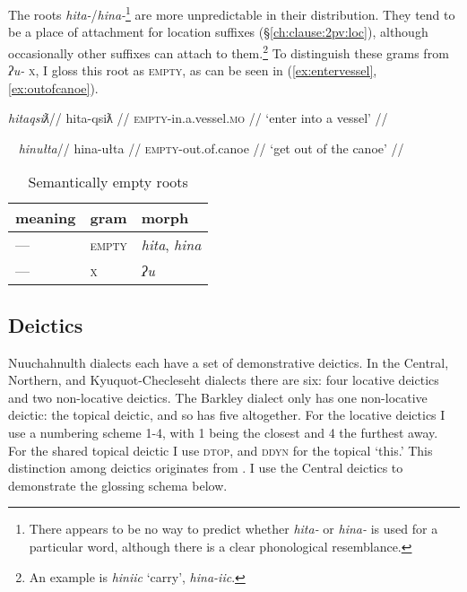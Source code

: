 The roots \textit{hita-}/\textit{hina-}\footnote{There appears to be no way to predict whether \textit{hita-} or \textit{hina-} is used for a particular word, although there is a clear phonological resemblance.} are more unpredictable in their distribution. They tend to be a place of attachment for location suffixes (\S\ref{ch:clause:2pv:loc}), although occasionally other suffixes can attach to them.\footnote{An example is \textit{hiniic} `carry', \textit{hina-iic}.} To distinguish these grams from \textit{ʔu-} \textsc{x}, I gloss this root as \textsc{empty}, as can be seen in (\ref{ex:entervessel}, \ref{ex:outofcanoe}).

\ex \label{ex:entervessel}
\begingl
\glpreamble \textit{hitaqsiƛ}//
\gla hita-qsiƛ //
\glb \textsc{empty}-in.a.vessel.\textsc{mo} //
\glft `enter into a vessel' //
\endgl
\xe

\ex~ \label{ex:outofcanoe}
\begingl
\glpreamble \textit{hinułta}//
\gla hina-ułta //
\glb \textsc{empty}-out.of.canoe //
\glft `get out of the canoe' //
\endgl
\xe

\begin{table}[ht]
\centering
\caption{Semantically empty roots}
\label{table:augdim}
\begin{tabular}{lll}
meaning                            & gram               & morph                                         \\ \hline
\multicolumn{1}{|l|}{---} & \multicolumn{1}{l|}{\textsc{empty}}   & \multicolumn{1}{l|}{\textit{hita}, \textit{hina}}                   \\ \hline
\multicolumn{1}{|l|}{---} & \multicolumn{1}{l|}{\textsc{x}}   & \multicolumn{1}{l|}{\textit{ʔu}}                   \\ \hline
\end{tabular}
\end{table}

\subsection{Deictics}

Nuuchahnulth dialects each have a set of demonstrative deictics. In the Central, Northern, and Kyuquot-Checleseht dialects there are six: four locative deictics and two non-locative deictics. The Barkley dialect only has one non-locative deictic: the topical deictic, and so has five altogether. For the locative deictics I use a numbering scheme 1-4, with 1 being the closest and 4 the furthest away. For the shared topical deictic I use \textsc{dtop}, and \textsc{ddyn} for the topical `this.' This distinction among deictics originates from \cite{werle2015}. I use the Central deictics to demonstrate the glossing schema below.

